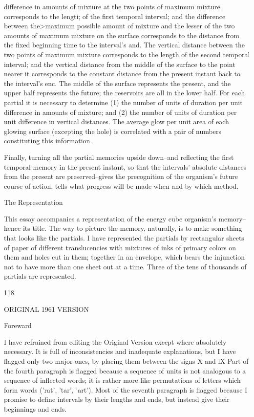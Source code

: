 \documentclass[10pt,twoside]{memoir}
\begin{document}
\begin{enumerate}
{\begin{enumerate}
\begin{sysrules}
\begin{sysrules}
\begin{sysrules}
\begin{sysrules}
{\begin{enumerate}
difference in amounts of mixture at the two points of maximum mixture 
corresponds to the lengti; of the first temporal interval; and the difference 
between the>maximum possible amount of mixture and the lesser of the two 
amounts of maximum mixture on the surface corresponds to the distance 
from the fixed beginning time to the interval's and. The vertical distance 
between the two points of maximum mixture corresponds to the length of 
the second temporal interval; and the vertical distance from the middle of 
the surface to the point nearer it corresponds to the constant distance from 
the present instant back to the interval's enc. The middle of the surface 
represents the present, and the upper half represents the future; the 
reservoirs are all in the lower half. For each partial it is necessary to 
determine (1) the number of units of duration per unit difference in 
amounts of mixture; and (2) the number of units of duration per unit 
difference in vertical distances. The average glow per unit area of each 
glowing surface (excepting the hole) is correlated with a pair of numbers 
constituting this information. 

Finally, turning all the partial memories upside down--and reflecting the 
first temporal memory in the present instant, so that the intervals' absolute 
distances from the present are preserved--gives the precognition of the 
organism's future course of action, tells what progress will be made when 
and by which method. 


The Representation 

This essay accompanies a representation of the energy cube organism's 
memory--hence its title. The way to picture the memory, naturally, is to 
make something that looks like the partials. I have represented the partials 
by rectangular sheets of paper of different translucencies with mixtures of 
inks of primary colors on them and holes cut in them; together in an 
envelope, which bears the injunction not to have more than one sheet out at 
a time. Three of the tens of thousands of partials are represented. 


118 


ORIGINAL 1961 VERSION 


Foreward 

I have refrained from editing the Original Version except where 
absolutely necessary. It is full of inconsistencies and inadequate 
explanations, but I have flagged only two major ones, by placing them 
between the signs X and lX Part of the fourth paragraph is flagged because a 
sequence of units is not analogous to a sequence of inflected words; it is 
rather more like permutations of letters which form words ('rat', 'tar', 'art'). 
Most of the seventh paragraph is flagged because I promise to define intervals 
by their lengths and ends, but instead give their beginnings and ends. 


\end{enumerate}}
\end{sysrules}
\end{sysrules}
\end{sysrules}
\end{sysrules}
\end{enumerate}}
\end{enumerate}
\end{document}
